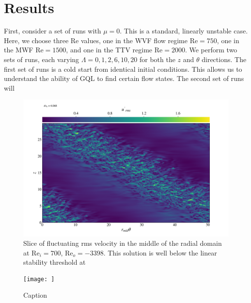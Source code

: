 \documentclass[openacc]{rstransa}%
\newcommand{\Reyn}{\mathrm{Re}}
\begin{document}
\section{Results}
\label{sec:nonlinear}

First, consider a set of runs with $\mu = 0$. This is a standard, linearly unstable case. Here, we choose three $\Reyn$ values, one in the WVF flow regime $\Reyn =750$, one in the MWF $\Reyn = 1500$, and one in the TTV regime $\Reyn = 2000$. We perform two sets of runs, each varying $\Lambda = {0, 1, 2, 6, 10, 20}$ for both the $z$ and $\theta$ directions. The first set of runs is a cold start from identical initial conditions. This allows us to understand the ability of GQL to find certain flow states. The second set of runs will 

\begin{figure}
    \centering
    \includegraphics[width=\textwidth]{../figs/urms_tz_rei_700_reo-3398_000278.png}
    \caption{Slice of fluctuating rms velocity in the middle of the radial domain at $\Reyn_i = 700$, $\Reyn_o = -3398$. This solution is well below the linear stability threshold at }
    \label{fig:urms_tz_rei700}
\end{figure}

\begin{figure}
    \centering
    \texttt{[image: ]}
    \caption{Caption}
    \label{fig:my_label}
\end{figure}
\end{document}
